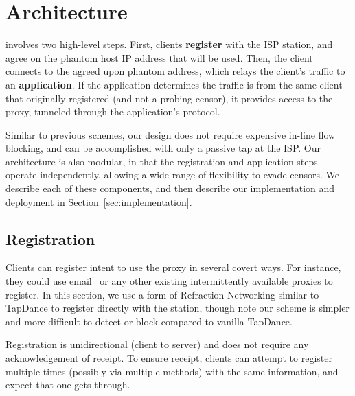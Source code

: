 \documentclass[sigconf,anonymous]{acmart}
\begin{document}


\section{Architecture}
\label{sec:architecture}

\scheme involves two high-level steps. First, clients \textbf{register} with the
ISP station,
and agree on the phantom host IP address that will be used. Then, the client
connects to the agreed upon phantom address, which relays the client's traffic
to an \textbf{application}. If the application determines the traffic is from
the same client that originally registered (and not a probing censor), it
provides access to the proxy, tunneled through the application's protocol.

Similar to previous schemes, our design does not require expensive in-line
flow blocking, and can be accomplished with only a passive tap at the ISP.
Our architecture is also modular, in that the registration and application steps operate
independently, allowing a wide range of flexibility to evade censors. We
describe each of these components, and then describe our implementation and
deployment in Section~\ref{sec:implementation}.

\subsection{Registration}
\label{sec:registration}
Clients can register intent to use the proxy in several covert ways. For
instance, they could use email~\cite{SWEET-ToN} or any other existing intermittently
available proxies
to register. In this section, we use a form of Refraction Networking similar to
TapDance to register directly with the station, though note our scheme is simpler and more
difficult to detect or block compared to vanilla TapDance.

Registration is unidirectional (client to server) and does not require any
acknowledgement of receipt. To ensure receipt, clients can attempt to register
multiple times (possibly via multiple methods) with the same information, and expect
that one gets through.
\end{document}
